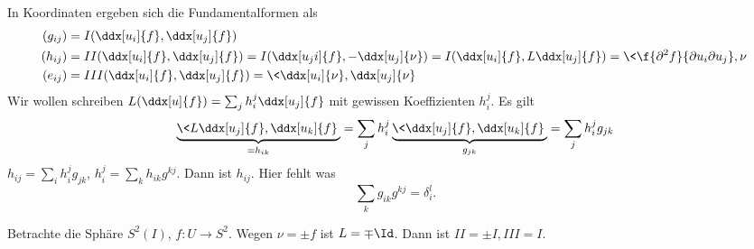 In Koordinaten ergeben sich die Fundamentalformen als
\begin{align*}
	(g_{ij}) &= I(\ddx[u_i]{f}, \ddx[u_j]{f}) \\
	(h_{ij}) &= II(\ddx[u_i]{f}, \ddx[u_j]{f}) = I(\ddx[u_ji]{f}, -\ddx[u_j]{\nu}) = I(\ddx[u_i]{f}, L \ddx[u_j]{f}) = \< \f{\partial^2 f}{\partial u_i \partial u_j}, \nu \> \\
	(e_{ij}) &= III(\ddx[u_i]{f}, \ddx[u_j]{f}) = \< \ddx[u_i]{\nu}, \ddx[u_j]{\nu} \>
\end{align*}
Wir wollen schreiben $L(\ddx[u]{f}) = \sum_{j} h_i^j \ddx[u_j]{f}$ mit gewissen Koeffizienten $h_i^j$.
Es gilt
\[
	\underbrace{\<L \ddx[u_j]{f}, \ddx[u_k]{f} \>}_{=h_{ik}}
	= \sum_{j} h_i^j \underbrace{\< \ddx[u_j]{f}, \ddx[u_k]{f}\>}_{g_{jk}}
	= \sum_{j} h_i^j g_{jk}
\]
$h_{ij} = \sum_{i} h_i^j g_{jk}$, $h_i^j = \sum_{k} h_{ik} g^{kj}$.
Dann ist $h_{ij}$. Hier fehlt was
\[
	\sum_{k} g_{ik} g^{kj} = \delta_i^l.
\]

\begin{ex}
	Betrachte die Sphäre $S^2(I)$, $f: U\to S^2$.
	Wegen $\nu = \pm f$ ist $L = \mp \Id$.
	Dann ist $II = \pm I, III = I$.
\end{ex}

